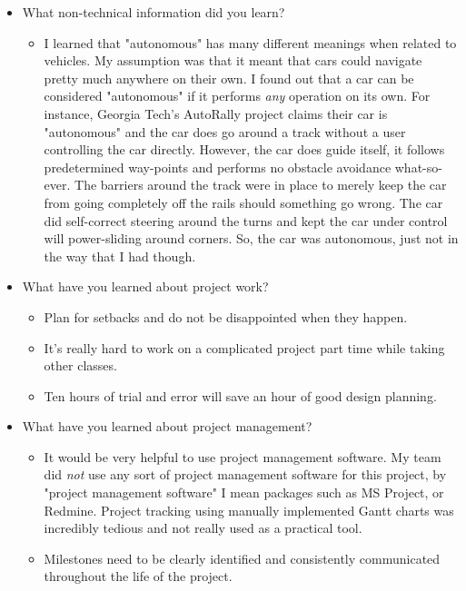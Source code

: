 \documentclass[compsoc,draftclsnofoot,onecolumn,10pt]{IEEEtran}
\begin{document}
\begin{itemize}
    \item What non-technical information did you learn?
    \begin{itemize}
        \item I learned that "autonomous" has many different meanings when related to vehicles. My assumption was that it meant that cars could navigate pretty much anywhere on their own. I found out that a car can be considered "autonomous" if it performs \textit{any} operation on its own. For instance, Georgia Tech's AutoRally project claims their car is "autonomous" and the car does go around a track without a user controlling the car directly. However, the car does guide itself, it follows predetermined way-points and performs no obstacle avoidance what-so-ever. The barriers around the track were in place to merely keep the car from going completely off the rails should something go wrong. The car did self-correct steering around the turns and kept the car under control will power-sliding around corners. So, the car was autonomous, just not in the way that I had though.
    \end{itemize}
    
    \item What have you learned about project work?
    \begin{itemize}
        \item Plan for setbacks and do not be disappointed when they happen.
        \item It's really hard to work on a complicated project part time while taking other classes.
        \item Ten hours of trial and error will save an hour of good design planning.
        \end{itemize}
    
    \item What have you learned about project management?
        \begin{itemize}
        \item It would be very helpful to use project management software.
        \subitem My team did \textit{not} use any sort of project management software for this project, by "project management software" I mean packages such as MS Project, or Redmine. Project tracking using manually implemented Gantt charts was incredibly tedious and not really used as a practical tool.
        \item Milestones need to be clearly identified and consistently communicated throughout the life of the project.
    \end{itemize}
    

\end{itemize}
\end{document}
